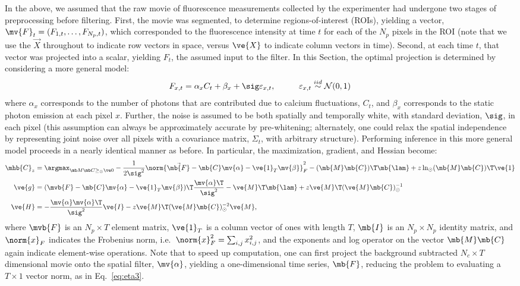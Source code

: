 In the above, we assumed that the raw movie of fluorescence measurements collected by the experimenter had undergone two stages of preprocessing before filtering.  First, the movie was segmented, to determine regions-of-interest (ROIs), yielding a vector, $\mv{F}_t=(F_{1,t}, \ldots, F_{N_p,t})$, which corresponded to the fluorescence intensity at time $t$ for each of the $N_p$ pixels in the ROI (note that we use the $\vec{X}$ throughout to indicate row vectors in space, versus $\ve{X}$ to indicate column vectors in time).  Second, at each time $t$, that vector was projected into a scalar, yielding $F_t$, the assumed input to the filter.  In this Section, the optimal projection is determined by considering a more general model:
\begin{align} \label{eq:bF}
F_{x,t} &= \alpha_x C_t + \beta_x +  \sig \varepsilon_{x,t}, \qquad &\varepsilon_{x,t} \overset{iid}{\sim} \mathcal{N}(0,1)   
\end{align}
\noindent where $\alpha_x$ corresponds to the number of photons that are contributed due to calcium fluctuations, $C_t$, and $\beta_x$ corresponds to the static photon emission at each pixel $x$.  Further, the noise is assumed to be both spatially and temporally white, with standard deviation, $\sig$, in each pixel (this assumption can always be approximately accurate by pre-whitening; alternately, one could relax the spatial independence by representing joint noise over all pixels with a covariance matrix, $\Sigma_{t}$, with arbitrary structure).  Performing inference in this more general model proceeds in a  nearly identical manner as before. In particular, the maximization, gradient, and Hessian become:
\begin{align} 
\mhb{C}_{\zzz} 
&= \az  -\frac{1}{2 \sig^2} \norm{\vec{\mb{F}} - \mb{C} \mv{\alpha} - \ve{1}_T \mv{\beta}}_F^2 - (\mb{M} \mb{C} )\T \mb{\lam}  + \zzz \ln_\odot(\mb{M} \mb{C})\T\ve{1}  \label{eq:eta4}\\
\ve{g} &= (\mvb{F} - \mb{C} \mv{\alpha} - \ve{1}_T \mv{\beta})\T\frac{\mv{\alpha}\T}{\sig^2} - \ve{M}\T\mb{\lam} + \zzz \ve{M}\T (\ve{M} \mb{C})_\odot^{-1} \label{eq:g2} \\
\ve{H} &= -\frac{\mv{\alpha} \mv{\alpha}\T}{\sig^2} \ve{I} - \zzz \ve{M}\T (\ve{M} \mb{C})_\odot^{-2} \ve{M}, \label{eq:H2}
\end{align}
\noindent where $\mvb{F}$ is an $N_p \times T$ element matrix, $\ve{1}_T$ is a column vector of ones with length $T$, $\mb{I}$ is an $N_p \times N_p$ identity matrix, and $\norm{x}_F$ indicates the Frobenius norm, i.e.\ $\norm{x}_F^2= \sum_{i,j} x_{i,j}^2$, and the exponents and log operator on the vector $\mb{M}\mb{C}$ again indicate element-wise operations.  Note that to speed up computation, one can first project the background subtracted $N_c \times T$ dimensional movie onto the spatial filter, $\mv{\alpha}$, yielding a one-dimensional time series, $\mb{F}$, reducing the problem to evaluating a $T \times 1$ vector norm, as in Eq.~\eqref{eq:eta3}.

